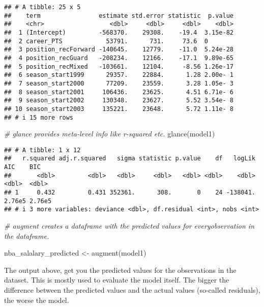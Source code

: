 \documentclass[
]{book}
\newenvironment{Shaded}{\begin{snugshade}}{\end{snugshade}}
\newcommand{\CommentTok}[1]{\textcolor[rgb]{0.56,0.35,0.01}{\textit{#1}}}
\newcommand{\FunctionTok}[1]{\textcolor[rgb]{0.00,0.00,0.00}{#1}}
\newcommand{\FunctionTok}[1]{\textcolor[rgb]{0.13,0.29,0.53}{\textbf{#1}}}
\newcommand{\NormalTok}[1]{#1}
\newcommand{\OtherTok}[1]{\textcolor[rgb]{0.56,0.35,0.01}{#1}}
\begin{document}
\begin{verbatim}
## # A tibble: 25 x 5
##    term                estimate std.error statistic  p.value
##    <chr>                  <dbl>     <dbl>     <dbl>    <dbl>
##  1 (Intercept)         -568370.    29308.    -19.4  3.15e-82
##  2 career_PTS            53791.      731.     73.6  0       
##  3 position_recForward -140645.    12779.    -11.0  5.24e-28
##  4 position_recGuard   -208234.    12166.    -17.1  9.89e-65
##  5 position_recMixed   -103661.    12104.     -8.56 1.26e-17
##  6 season_start1999      29357.    22884.      1.28 2.00e- 1
##  7 season_start2000      77209.    23559.      3.28 1.05e- 3
##  8 season_start2001     106436.    23625.      4.51 6.71e- 6
##  9 season_start2002     130348.    23627.      5.52 3.54e- 8
## 10 season_start2003     135221.    23648.      5.72 1.11e- 8
## # i 15 more rows
\end{verbatim}

\begin{Shaded}
\begin{Highlighting}[]
\CommentTok{\# glance provides meta{-}level info like r{-}squared etc.}
\FunctionTok{glance}\NormalTok{(model1)}
\end{Highlighting}
\end{Shaded}

\begin{verbatim}
## # A tibble: 1 x 12
##   r.squared adj.r.squared   sigma statistic p.value    df   logLik    AIC    BIC
##       <dbl>         <dbl>   <dbl>     <dbl>   <dbl> <dbl>    <dbl>  <dbl>  <dbl>
## 1     0.432         0.431 352361.      308.       0    24 -138041. 2.76e5 2.76e5
## # i 3 more variables: deviance <dbl>, df.residual <int>, nobs <int>
\end{verbatim}

\begin{Shaded}
\begin{Highlighting}[]
\CommentTok{\# augment creates a dataframe with the predicted values for everyobservation in the dataframe. }

\NormalTok{nba\_salalary\_predicted }\OtherTok{\textless{}{-}} \FunctionTok{augment}\NormalTok{(model1)}
\end{Highlighting}
\end{Shaded}

The output above, get you the predicted values for the observations in the dataset. This is mostly used to evaluate the model itself. The bigger the difference between the predicted values and the actual values (so-called residuals), the worse the model.
\end{document}
